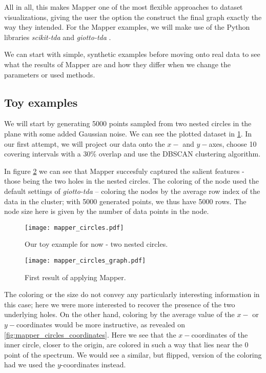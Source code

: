 All in all, this makes Mapper one of the most flexible approaches to dataset visualizations, giving the user the option the construct the final graph exactly the way they intended. For the Mapper examples, we will make use of the Python libraries \textit{scikit-tda} \cite{scikittda2019} and \textit{giotto-tda} \cite{tauzin2020giottotda}.

We can start with simple, synthetic examples before moving onto real data to see what the results of Mapper are and how they differ when we change the parameters or used methods.

\subsection{Toy examples}
We will start by generating 5000 points sampled from two nested circles in the plane with some added Gaussian noise. We can see the plotted dataset in \ref{fig:mapper_circles}. In our first attempt, we will project our data onto the $x-$ and $y-$axes, choose 10 covering intervals with a 30\% overlap and use the DBSCAN clustering algorithm.

In figure \ref{fig:mapper_circles_graph} we can see that Mapper succesfuly captured the salient features - those being the two holes in the nested circles. The coloring of the node used the default settings of \textit{giotto-tda} -- coloring the nodes by the average row index of the data in the cluster; with 5000 generated points, we thus have 5000 rows. The node size here is given by the number of data points in the node.

\begin{figure}[h!]
  \centering
  \texttt{[image: mapper\_circles.pdf]}
  \caption{Our toy example for now - two nested circles.}
  \label{fig:mapper_circles}
\end{figure}

\begin{figure}[h!]
  \centering
  \texttt{[image: mapper\_circles\_graph.pdf]}
  \caption{First result of applying Mapper.}
  \label{fig:mapper_circles_graph}
\end{figure}

The coloring or the size do not convey any particularly interesting information in this case; here we were more interested to recover the presence of the two underlying holes. On the other hand, coloring by the average value of the $x-$ or $y-$coordinates would be more instructive, as revealed on \ref{fig:mapper_circles_coordinates}. Here we see that the $x-$coordinates of the inner circle, closer to the origin, are colored in such a way that lies near the $0$ point of the spectrum. We would see a similar, but flipped, version of the coloring had we used the $y$-coordinates instead.

